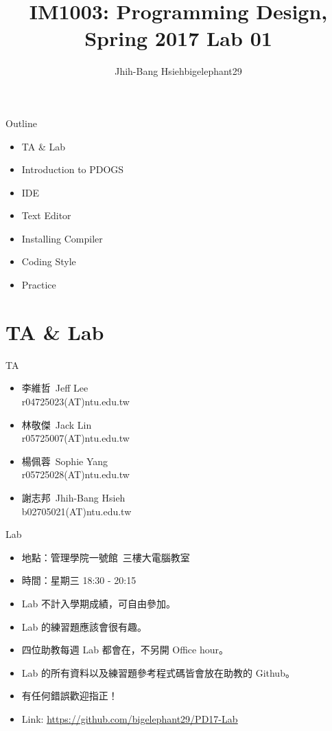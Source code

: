 \documentclass[t]{beamer}
\title{IM1003: Programming Design, Spring 2017  \linebreak Lab 01}
\author[bigelephant29]{Jhih-Bang Hsieh\linebreak \small{bigelephant29}}
\institute{\textbf{National Taiwan University}}
\date{}
\begin{document}
\begin{frame}
  \maketitle
\end{frame}

\begin{frame}{Outline}
  \begin{itemize}
    \item TA \& Lab
    \item Introduction to PDOGS
    \item IDE
    \item Text Editor
    \item Installing Compiler
    \item Coding Style
    \item Practice
  \end{itemize}
\end{frame}

\section{TA \& Lab}
\begin{frame}{TA}
  \begin{itemize}
    \setlength\itemsep{1em}
    \item
    李維哲\ Jeff Lee\\
    r04725023(AT)ntu.edu.tw
    \item
    林敬傑\ Jack Lin\\
    r05725007(AT)ntu.edu.tw
    \item
    楊佩蓉\ Sophie Yang\\
    r05725028(AT)ntu.edu.tw
    \item
    謝志邦\ Jhih-Bang Hsieh\\
    b02705021(AT)ntu.edu.tw
  \end{itemize}
\end{frame}

\begin{frame}{Lab}
  \begin{itemize}
    \item 地點：管理學院一號館\ 三樓大電腦教室
    \item 時間：星期三 18:30 - 20:15
    \item Lab 不計入學期成績，可自由參加。
    \item Lab 的練習題應該會很有趣。
    \item 四位助教每週 Lab 都會在，不另開 Office hour。
    \item Lab 的所有資料以及練習題參考程式碼皆會放在助教的 Github。
    \item 有任何錯誤歡迎指正！
    \item Link: \href{https://github.com/bigelephant29/PD17-Lab}{\underline{https://github.com/bigelephant29/PD17-Lab}}
  \end{itemize}
\end{frame}
\end{document}

